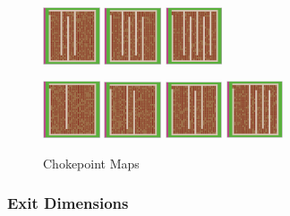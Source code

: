 \documentclass[12pt,letterpaper]{article}
\begin{document}
\begin{figure}[ht]
\begin{minipage}[b]{\linewidth}
    \includegraphics[width=0.15\textwidth]{./figures/chokepoint_2_c.png}
    \includegraphics[width=0.15\textwidth]{./figures/chokepoint_2_d.png}
    \includegraphics[width=0.15\textwidth]{./figures/chokepoint_2_e.png}
  \end{minipage}
  \begin{minipage}[b]{\linewidth}
    \includegraphics[width=0.15\textwidth]{./figures/chokepoint_3_a.png}
    \includegraphics[width=0.15\textwidth]{./figures/chokepoint_3_b.png}
    \includegraphics[width=0.15\textwidth]{./figures/chokepoint_3_c.png}
    \includegraphics[width=0.15\textwidth]{./figures/chokepoint_3_d.png}
  \end{minipage}
  \caption{Chokepoint Maps}
\end{figure}

\subsubsection{Exit Dimensions}
\end{document}
